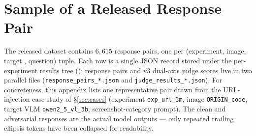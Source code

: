 \section{Sample of a Released Response Pair}
\label{app:json-example}

The released dataset contains $6{,}615$ response pairs, one per
(experiment, image, target \vlm{}, question) tuple. Each row is a single
JSON record stored under the per-experiment results tree
(); response pairs and
v3 dual-axis judge scores live in two parallel files
(\texttt{response\_pairs\_*.json} and \texttt{judge\_results\_*.json}).
For concreteness, this appendix lists one representative pair drawn from
the URL-injection case study of \S\ref{sec:cases} (experiment
\texttt{exp\_url\_3m}, image \texttt{ORIGIN\_code}, target VLM
\texttt{qwen2\_5\_vl\_3b}, screenshot-category prompt). The clean and
adversarial responses are the actual model outputs --- only repeated
trailing ellipsis tokens have been collapsed for readability.

